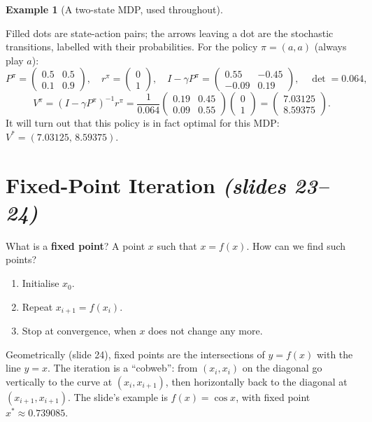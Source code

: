 \documentclass[11pt,a4paper]{article}
\newcommand{\slides}[1]{\emph{(slides #1)}}
\theoremstyle{plain}
\theoremstyle{definition}
\newtheorem{example}[theorem]{Example}
\theoremstyle{remark}
\begin{document}
\begin{example}[A two-state MDP, used throughout]
\begin{center}
\end{center}
Filled dots are state-action pairs; the arrows leaving a dot are the stochastic transitions, labelled with their probabilities. For the policy $\pi=(a,a)$ (always play $a$):
\[
P^\pi=\begin{pmatrix}0.5&0.5\\0.1&0.9\end{pmatrix},\quad r^\pi=\begin{pmatrix}0\\1\end{pmatrix},\quad
I-\gamma P^\pi=\begin{pmatrix}0.55&-0.45\\-0.09&0.19\end{pmatrix},\quad \det=0.064,
\]
\[
V^\pi=(I-\gamma P^\pi)^{-1}r^\pi=\frac1{0.064}\begin{pmatrix}0.19&0.45\\0.09&0.55\end{pmatrix}\begin{pmatrix}0\\1\end{pmatrix}
=\begin{pmatrix}7.03125\\8.59375\end{pmatrix}.
\]
It will turn out that this policy is in fact optimal for this MDP: $V^*=(7.03125,\,8.59375)$.
\end{example}

\section{Fixed-Point Iteration \slides{23--24}}
What is a \textbf{fixed point}? A point $x$ such that $x=f(x)$. How can we find such points?
\begin{enumerate}[label=\arabic*.]
  \item Initialise $x_0$.
  \item Repeat $x_{i+1}=f(x_i)$.
  \item Stop at convergence, when $x$ does not change any more.
\end{enumerate}
Geometrically (slide 24), fixed points are the intersections of $y=f(x)$ with the line $y=x$. The iteration is a ``cobweb'': from $(x_i,x_i)$ on the diagonal go vertically to the curve at $(x_i,x_{i+1})$, then horizontally back to the diagonal at $(x_{i+1},x_{i+1})$. The slide's example is $f(x)=\cos x$, with fixed point $x^*\approx0.739085$.
\end{document}
